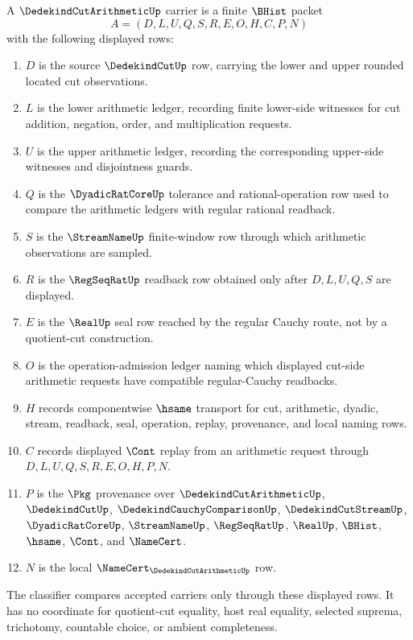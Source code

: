\begin{definition}
\label{def:dedekind-cut-arithmetic-carrier}
A $\DedekindCutArithmeticUp$ carrier is a finite $\BHist$ packet
$$
A=(D,L,U,Q,S,R,E,O,H,C,P,N)
$$
with the following displayed rows:
\begin{enumerate}
\item $D$ is the source $\DedekindCutUp$ row, carrying the lower and upper rounded located cut observations.
\item $L$ is the lower arithmetic ledger, recording finite lower-side witnesses for cut addition, negation, order, and multiplication requests.
\item $U$ is the upper arithmetic ledger, recording the corresponding upper-side witnesses and disjointness guards.
\item $Q$ is the $\DyadicRatCoreUp$ tolerance and rational-operation row used to compare the arithmetic ledgers with regular rational readback.
\item $S$ is the $\StreamNameUp$ finite-window row through which arithmetic observations are sampled.
\item $R$ is the $\RegSeqRatUp$ readback row obtained only after $D,L,U,Q,S$ are displayed.
\item $E$ is the $\RealUp$ seal row reached by the regular Cauchy route, not by a quotient-cut construction.
\item $O$ is the operation-admission ledger naming which displayed cut-side arithmetic requests have compatible regular-Cauchy readbacks.
\item $H$ records componentwise $\hsame$ transport for cut, arithmetic, dyadic, stream, readback, seal, operation, replay, provenance, and local naming rows.
\item $C$ records displayed $\Cont$ replay from an arithmetic request through $D,L,U,Q,S,R,E,O,H,P,N$.
\item $P$ is the $\Pkg$ provenance over $\DedekindCutArithmeticUp$, $\DedekindCutUp$, $\DedekindCauchyComparisonUp$, $\DedekindCutStreamUp$, $\DyadicRatCoreUp$, $\StreamNameUp$, $\RegSeqRatUp$, $\RealUp$, $\BHist$, $\hsame$, $\Cont$, and $\NameCert$.
\item $N$ is the local $\NameCert_{\DedekindCutArithmeticUp}$ row.
\end{enumerate}
The classifier compares accepted carriers only through these displayed rows. It has no coordinate for quotient-cut equality, host real equality, selected suprema, trichotomy, countable choice, or ambient completeness.
\end{definition}


